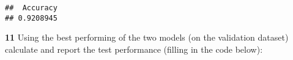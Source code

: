 \documentclass[
]{article}
\newenvironment{Shaded}{\begin{snugshade}}{\end{snugshade}}
\newcommand{\CommentTok}[1]{\textcolor[rgb]{0.56,0.35,0.01}{\textit{#1}}}
\newcommand{\FunctionTok}[1]{\textcolor[rgb]{0.13,0.29,0.53}{\textbf{#1}}}
\newcommand{\NormalTok}[1]{#1}
\newcommand{\OtherTok}[1]{\textcolor[rgb]{0.56,0.35,0.01}{#1}}
\newcommand{\SpecialCharTok}[1]{\textcolor[rgb]{0.81,0.36,0.00}{\textbf{#1}}}
\newcommand{\StringTok}[1]{\textcolor[rgb]{0.31,0.60,0.02}{#1}}
\begin{document}
\begin{Shaded}
\end{Shaded}

\begin{verbatim}
##  Accuracy 
## 0.9208945
\end{verbatim}

\textbf{11} Using the best performing of the two models (on the
validation dataset) calculate and report the test performance (filling
in the code below):
\end{document}
